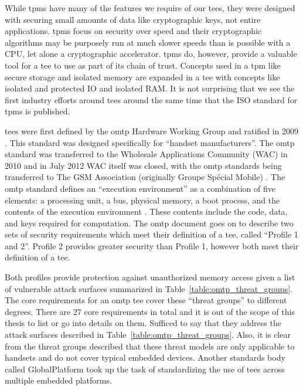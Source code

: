 While \glspl{tpm} have many of the features we require of our \glspl{tee}, they were designed with securing small amounts of data like cryptographic keys, not entire applications. \glspl{tpm} focus on security over speed and their cryptographic algorithms may be purposely run at much slower speeds than is possible with a CPU, let alone a cryptographic accelerator. \glspl{tpm} do, however, provide a valuable tool for a \gls{tee} to use as part of its chain of trust. Concepts used in a \gls{tpm} like secure storage and isolated memory are expanded in a \gls{tee} with concepts like isolated and protected IO and isolated RAM. It is not surprising that we see the first industry efforts around \glspl{tee} around the same time that the ISO standard for \glspl{tpm} is published.

\glspl{tee} were first defined by the \gls{omtp} Hardware Working Group and ratified in 2009 \cite{Confidential2009}. This standard was designed specifically for ``handset manufacturers''. The \gls{omtp} standard was transferred to the Wholesale Applications Community (WAC) in 2010 and in July 2012 WAC itself was closed, with the \gls{omtp} standards being transferred to The GSM Association (originally Groupe Sp\'ecial Mobile) \cite{WAC}. The \gls{omtp} standard defines an ``execution environment'' as a combination of five elements: a processing unit, a bus, physical memory, a boot process, and the contents of the execution environment \cite{Confidential2009}. These contents include the code, data, and keys required for computation. The \gls{omtp} document goes on to describe two sets of security requirements which meet their definition of a \gls{tee}, called ``Profile 1 and 2''. Profile 2 provides greater security than Profile 1, however both meet their definition of a \gls{tee}.

\renewcommand{\arraystretch}{2}


Both profiles provide protection against unauthorized memory access given a list of vulnerable attack surfaces summarized in Table~\ref{table:omtp_threat_groups}. The core requirements for an \gls{omtp} \gls{tee} cover these ``threat groups'' to different degrees. There are 27 core requirements in total and it is out of the scope of this thesis to list or go into details on them. Sufficed to say that they address the attack surfaces described in Table~\ref{table:omtp_threat_groups}. Also, it is clear from the threat groups described that these threat models are only applicable to handsets and do not cover typical embedded devices. Another standards body called GlobalPlatform took up the task of standardizing the use of \glspl{tee} across multiple embedded platforms.

